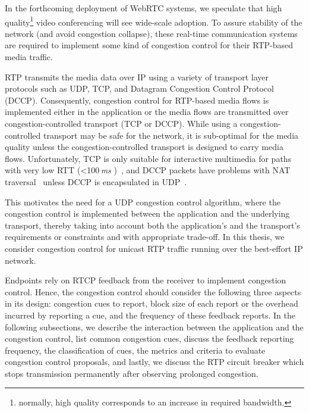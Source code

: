In the forthcoming deployment of WebRTC systems, we speculate that high
quality\footnote{normally, high quality corresponds to an increase in required
bandwidth.} video conferencing will see wide-scale adoption. To assure
stability of the network (and avoid congestion collapse), these real-time
communication systems are required to implement some kind of congestion
control for their RTP-based media traffic.

RTP transmits the media data over IP using a variety of transport layer
protocols such as UDP, TCP, and Datagram Congestion Control Protocol (DCCP).
Consequently, congestion control for RTP-based media flows is implemented
either in the application or the media flows are transmitted over
congestion-controlled transport (TCP or DCCP). While using a congestion-controlled
transport may be safe for the network, it is sub-optimal for the
media quality unless the congestion-controlled transport is designed to carry
media flows. Unfortunately, TCP is only suitable for interactive multimedia
for paths with very low RTT (<100\,\emph{ms} )~\cite{Brosh:tcp-real-time}, and
DCCP packets have problems with NAT traversal~\cite{schier:DCCP} unless DCCP is
encapsulated in UDP~\cite{RFC6773}.

This motivates the need for a UDP congestion control algorithm, where the
congestion control is implemented between the application and the
underlying transport, thereby taking into
account both the application's and the transport's requirements or constraints
and with appropriate trade-off. In this thesis, we consider congestion
control for unicast RTP traffic running over the best-effort IP network.


Endpoints rely on RTCP feedback from the receiver to implement congestion
control. Hence, the congestion control should consider the following three aspects
in its design: congestion cues to report, block size of each report or the
overhead incurred by reporting a cue, and the frequency of these feedback
reports. In the following subsections, we describe the interaction between the
application and the congestion control, list common congestion cues, discuss
the feedback reporting frequency, the classification of cues, the metrics and
criteria to evaluate congestion control proposals, and lastly, we discuss the
RTP circuit breaker which stops transmission permanently after observing
prolonged congestion.

